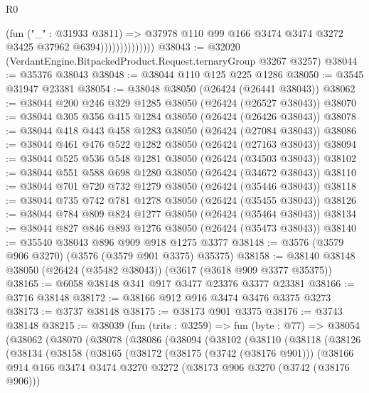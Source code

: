 \begin{lexlean}{R0}
\begin{coremodule}
                              (fun ("_" : @31933 @3811) =>
                              @37978
                                @110
                                @99
                                @166
                                @3474
                                @3474
                                @3272
                                @3425
                                @37962
                                @6394))))))))))))))
@38043 := @32020 (VerdantEngine.BitpackedProduct.Request.ternaryGroup @3267 @3257)
@38044 := @35376 @38043
@38048 := @38044 @110 @125 @225 @1286
@38050 := @3545 @31947 @23381
@38054 := @38048 @38050 (@26424 (@26441 @38043))
@38062 := @38044 @200 @246 @329 @1285 @38050 (@26424 (@26527 @38043))
@38070 := @38044 @305 @356 @415 @1284 @38050 (@26424 (@26426 @38043))
@38078 := @38044 @418 @443 @458 @1283 @38050 (@26424 (@27084 @38043))
@38086 := @38044 @461 @476 @522 @1282 @38050 (@26424 (@27163 @38043))
@38094 := @38044 @525 @536 @548 @1281 @38050 (@26424 (@34503 @38043))
@38102 := @38044 @551 @588 @698 @1280 @38050 (@26424 (@34672 @38043))
@38110 := @38044 @701 @720 @732 @1279 @38050 (@26424 (@35446 @38043))
@38118 := @38044 @735 @742 @781 @1278 @38050 (@26424 (@35455 @38043))
@38126 := @38044 @784 @809 @824 @1277 @38050 (@26424 (@35464 @38043))
@38134 := @38044 @827 @846 @893 @1276 @38050 (@26424 (@35473 @38043))
@38140 := @35540 @38043 @896 @909 @918 @1275 @3377
@38148 := @3576 (@3579 @906 @3270) (@3576 (@3579 @901 @3375) @35375)
@38158 := @38140 @38148 @38050 (@26424 (@35482 @38043)) (@3617 (@3618 @909 @3377 @35375))
@38165 := @6058 @38148 @341 @917 @3477 @23376 @3377 @23381
@38166 := @3716 @38148
@38172 := @38166 @912 @916 @3474 @3476 @3375 @3273
@38173 := @3737 @38148
@38175 := @38173 @901 @3375
@38176 := @3743 @38148
@38215 := @38039
    (fun (trits : @3259) =>
    fun (byte : @77) =>
    @38054
      (@38062
        (@38070
          (@38078
            (@38086
              (@38094
                (@38102
                  (@38110
                    (@38118
                      (@38126
                        (@38134
                          (@38158
                            (@38165
                              (@38172
                                (@38175 (@3742 (@38176 @901)))
                                (@38166
                                  @914
                                  @166
                                  @3474
                                  @3474
                                  @3270
                                  @3272
                                  (@38173 @906 @3270 (@3742 (@38176 @906)))

\end{coremodule}
\end{lexlean}
